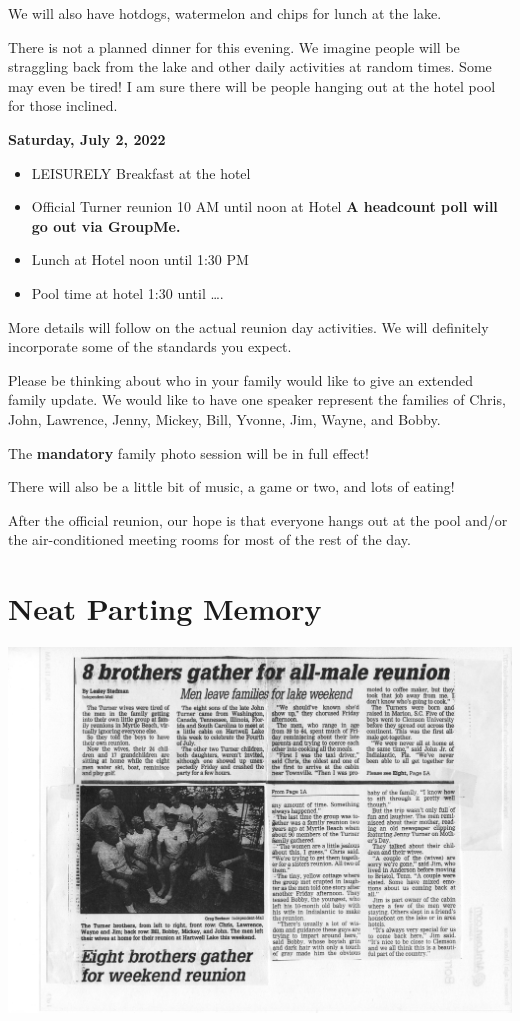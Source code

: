 \documentclass[
]{book}
\providecommand{\tightlist}{%
  \setlength{\itemsep}{0pt}\setlength{\parskip}{0pt}}
\begin{document}
We will also have hotdogs, watermelon and chips for lunch at the lake.

There is not a planned dinner for this evening. We imagine people will be straggling back from the lake and other daily activities at random times. Some may even be tired! I am sure there will be people hanging out at the hotel pool for those inclined.

\textbf{Saturday, July 2, 2022}

\begin{itemize}
\tightlist
\item
  LEISURELY Breakfast at the hotel
\item
  Official Turner reunion 10 AM until noon at Hotel \textbf{A headcount poll will go out via GroupMe.}
\item
  Lunch at Hotel noon until 1:30 PM
\item
  Pool time at hotel 1:30 until \ldots.
\end{itemize}

More details will follow on the actual reunion day activities. We will definitely incorporate some of the standards you expect.

Please be thinking about who in your family would like to give an extended family update. We would like to have one speaker represent the families of Chris, John, Lawrence, Jenny, Mickey, Bill, Yvonne, Jim, Wayne, and Bobby.

The \textbf{mandatory} family photo session will be in full effect!

There will also be a little bit of music, a game or two, and lots of eating!

After the official reunion, our hope is that everyone hangs out at the pool and/or the air-conditioned meeting rooms for most of the rest of the day.

\hypertarget{neat-parting-memory}{%
\section*{Neat Parting Memory}\label{neat-parting-memory}}

\includegraphics[width=1\linewidth]{images/brothers}
\end{document}
